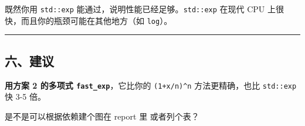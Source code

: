 \documentclass[11pt, a4paper]{article}
\begin{document}
\begin{aibox}
既然你用 \texttt{std::exp} 能通过，说明性能已经足够。\texttt{std::exp} 在现代 CPU 上很快，而且你的瓶颈可能在其他地方（如 \texttt{log}）。

\begin{center}\rule{\textwidth}{0.4pt}\end{center}

\subsection*{六、建议}

\textbf{用方案 2 的多项式 \texttt{fast\_exp}}，它比你的 \texttt{(1+x/n)\textasciicircum n} 方法更精确，也比 \texttt{std::exp} 快 3-5 倍。
\end{aibox}

\vspace{1.5em}

\begin{userbox}
是不是可以根据依赖建个图在 report 里 或者列个表？
\end{userbox}
\end{document}
